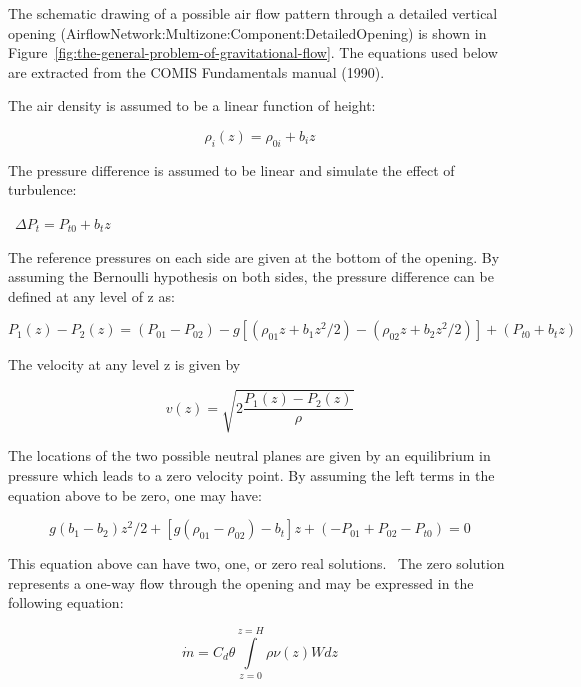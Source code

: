 The schematic drawing of a possible air flow pattern through a detailed vertical opening (AirflowNetwork:Multizone:Component:DetailedOpening) is shown in Figure~\ref{fig:the-general-problem-of-gravitational-flow}. The equations used below are extracted from the COMIS Fundamentals manual (1990).

The air density is assumed to be a linear function of height:

\begin{equation}
{\rho_i}(z) = {\rho_{0i}} + {b_i}z
\end{equation}

The pressure difference is assumed to be linear and simulate the effect of turbulence:

~\(\Delta {P_t} = {P_{t0}} + {b_t}z\)

The reference pressures on each side are given at the bottom of the opening. By assuming the Bernoulli hypothesis on both sides, the pressure difference can be defined at any level of z as:

\begin{equation}
{P_1}(z) - {P_2}(z) = ({P_{01}} - {P_{02}}) - g\left[ {({\rho_{01}}z + {b_1}{z^2}/2) - ({\rho_{02}}z + {b_2}{z^2}/2)} \right] + ({P_{t0}} + {b_t}z)
\end{equation}

The velocity at any level z is given by

\begin{equation}
v(z) = \sqrt {2\frac{{{P_1}(z) - {P_2}(z)}}{\rho }}
\end{equation}

The locations of the two possible neutral planes are given by an equilibrium in pressure which leads to a zero velocity point. By assuming the left terms in the equation above to be zero, one may have:

\begin{equation}
g({b_1} - {b_2}){z^2}/2 + \left[ {g({\rho_{01}} - {\rho_{02}}) - {b_t}} \right]z + ( - {P_{01}} + {P_{02}} - {P_{t0}}) = 0
\end{equation}

This equation above can have two, one, or zero real solutions.~ The zero solution represents a one-way flow through the opening and may be expressed in the following equation:

\begin{equation}
\dot m = {C_d}\theta \int\limits_{z = 0}^{z = H} {\rho \nu (z)Wdz}
\end{equation}

